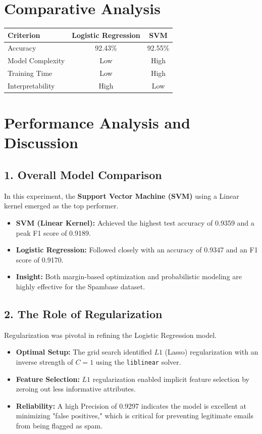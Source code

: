 \documentclass[11pt]{article}
\begin{document}
\section*{Comparative Analysis}

\begin{table}[H]
\centering
\renewcommand{\arraystretch}{1.3}
\begin{tabular}{|l|c|c|}
\hline
Criterion & Logistic Regression & SVM \\ \hline
Accuracy & 92.43\% & 92.55\% \\ \hline
Model Complexity & Low & High \\ \hline
Training Time & Low & High \\ \hline
Interpretability & High & Low \\ \hline
\end{tabular}
\end{table}
\section*{Performance Analysis and Discussion}

\subsection*{1. Overall Model Comparison}
In this experiment, the \textbf{Support Vector Machine (SVM)} using a Linear kernel emerged as the top performer.
\begin{itemize}
    \item \textbf{SVM (Linear Kernel):} Achieved the highest test accuracy of 0.9359 and a peak F1 score of 0.9189.
    \item \textbf{Logistic Regression:} Followed closely with an accuracy of 0.9347 and an F1 score of 0.9170.
    \item \textbf{Insight:} Both margin-based optimization and probabilistic modeling are highly effective for the Spambase dataset.
\end{itemize}

\subsection*{2. The Role of Regularization}
Regularization was pivotal in refining the Logistic Regression model.
\begin{itemize}
    \item \textbf{Optimal Setup:} The grid search identified $L1$ (Lasso) regularization with an inverse strength of $C=1$ using the \texttt{liblinear} solver.
    \item \textbf{Feature Selection:} $L1$ regularization enabled implicit feature selection by zeroing out less informative attributes.
    \item \textbf{Reliability:} A high Precision of 0.9297 indicates the model is excellent at minimizing "false positives," which is critical for preventing legitimate emails from being flagged as spam.
\end{itemize}
\end{document}
